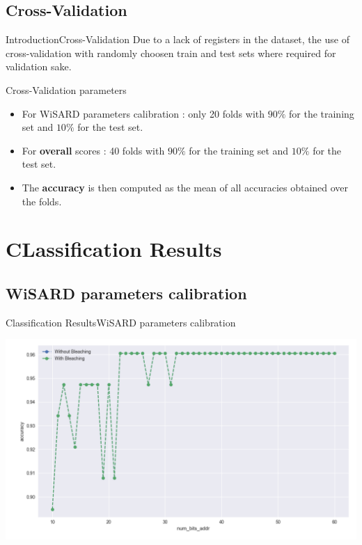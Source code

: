 \documentclass[10pt]{beamer}
\begin{document}
\subsection{Cross-Validation}
\begin{frame}{Introduction}{Cross-Validation}
Due to a lack of registers in the dataset, the use of cross-validation
with randomly choosen train and test sets where required for validation sake.
\bigskip
\begin{block}{Cross-Validation parameters}
\begin{itemize}
   \item For WiSARD parameters calibration : only 20 folds with $90\%$ for
     the training set and $10\%$ for the test set.
   \item For \textbf{overall} scores : 40 folds with $90\%$ for
     the training set and $10\%$ for the test set.
    \item The \textbf{accuracy} is then computed as the mean of all accuracies obtained
      over the folds.
\end{itemize}
\end{block}

\end{frame}

\section{CLassification Results}
\subsection{WiSARD parameters calibration}
\begin{frame}{Classification Results}{WiSARD parameters calibration}

\begin{minipage}{0.95\linewidth}
  \centering
  \includegraphics[scale=0.37]{../figures_trabalho_final/wisard_parameters_results.png}
  \medskip
\end{minipage}

\end{frame}
\end{document}

